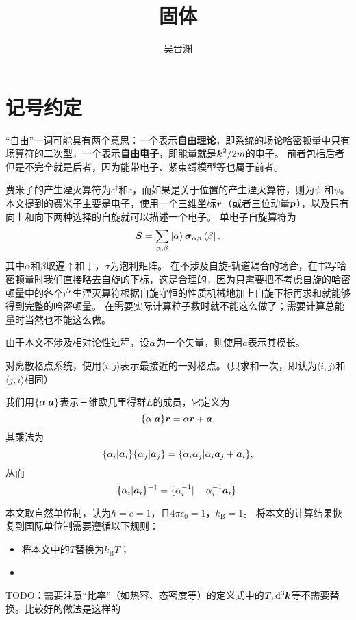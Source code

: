 \documentclass[hyperref, UTF8, a4paper]{ctexbook}
\title{固体}
\author{吴晋渊}
\newcommand*{\pair}[1]{\langle #1 \rangle}
\renewcommand{\emph}[1]{\textbf{#1}}
\numberwithin{equation}{chapter}
\begin{document}
\maketitle

\section*{记号约定}

“自由”一词可能具有两个意思：一个表示\emph{自由理论}，即系统的场论哈密顿量中只有场算符的二次型，一个表示\emph{自由电子}，即能量就是$\vb*{k}^2/2m$的电子。
前者包括后者但是不完全就是后者，因为能带电子、紧束缚模型等也属于前者。

费米子的产生湮灭算符为${c}^\dagger$和${c}$，而如果是关于位置的产生湮灭算符，则为${\psi}^\dagger$和${\psi}$。
本文提到的费米子主要是电子，使用一个三维坐标$\vb*{r}$（或者三位动量$\vb*{p}$），以及只有向上和向下两种选择的自旋就可以描述一个电子。
单电子自旋算符为
\begin{equation}
    {\vb*{S}} = \sum_{\alpha, \beta} \ket{\alpha} \vb*{\sigma}_{\alpha \beta} \bra{\beta},
\end{equation}
其中$\alpha$和$\beta$取遍$\uparrow$和$\downarrow$，$\sigma$为泡利矩阵。
在不涉及自旋-轨道耦合的场合，在书写哈密顿量时我们直接略去自旋的下标，这是合理的，因为只需要把不考虑自旋的哈密顿量中的各个产生湮灭算符根据自旋守恒的性质机械地加上自旋下标再求和就能够得到完整的哈密顿量。
在需要实际计算粒子数时就不能这么做了；需要计算总能量时当然也不能这么做。

由于本文不涉及相对论性过程，设$\vb*{a}$为一个矢量，则使用$a$表示其模长。

对离散格点系统，使用$\pair{i, j}$表示最接近的一对格点。（只求和一次，即认为$\pair{i, j}$和$\pair{j, i}$相同）

我们用$\{\alpha | \vb*{a} \}$表示三维欧几里得群$E$的成员，它定义为
\begin{equation}
    \{\alpha | \vb*{a} \} \vb*{r} = \alpha \vb*{r} + \vb*{a},
\end{equation}
其乘法为
\begin{equation}
    \{\alpha_i | \vb*{a}_i \} \{\alpha_j | \vb*{a}_j \} = \{ \alpha_i \alpha_j | \alpha_i \vb*{a}_j + \vb*{a}_i \},
\end{equation}
从而
\begin{equation}
    \{\alpha_i | \vb*{a}_i \}^{-1} = \{ \alpha_i^{-1} | - \alpha_i^{-1} \vb*{a}_i \}.
\end{equation}

本文取自然单位制，认为$\hbar=c=1$，且$4\pi\epsilon_0=1$，$k_\text{B}=1$。
将本文的计算结果恢复到国际单位制需要遵循以下规则：
\begin{itemize}
    \item 将本文中的$T$替换为$k_\text{B} T$；
    \item 
\end{itemize}
TODO：需要注意“比率”（如热容、态密度等）的定义式中的$T, \dd[3]{\vb*{k}}$等不需要替换。比较好的做法是这样的
\end{document}
